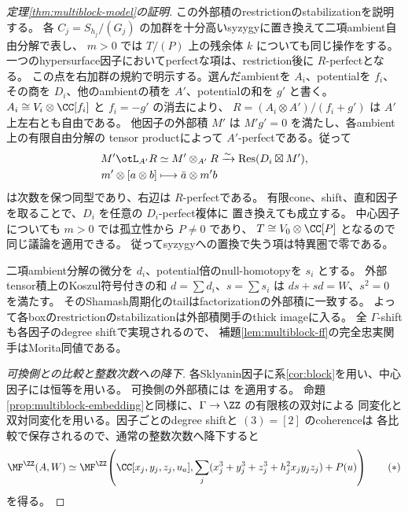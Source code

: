 \begin{proof}[定理\ref{thm:multiblock-model}の証明]
 この外部積のrestrictionのstabilizationを説明する。
 各 \(C_j=S_{h_j}/(G_j)\) の加群を十分高いsyzygyに置き換えて二項ambient自由分解で表し、
 \(m>0\) では \(T/(P)\) 上の残余体 \(k\) についても同じ操作をする。
 一つのhypersurface因子においてperfectな項は、restriction後に \(R\)-perfectとなる。
 この点を右加群の規約で明示する。選んだambientを \(A_i\)、potentialを \(f_i\)、
 その商を \(D_i\)、他のambientの積を \(A'\)、potentialの和を \(g'\) と書く。
 \(A_i\cong V_i\otimes\CC[f_i]\) と \(f_i=-g'\) の消去により、
 \(R=(A_i\otimes A')/(f_i+g')\) は \(A'\) 上左右とも自由である。
 他因子の外部積 \(M'\) は \(M'g'=0\) を満たし、各ambient上の有限自由分解の
 tensor productによって \(A'\)-perfectである。従って
 \[
 \begin{aligned}
 M'\otL_{A'}R&\simeq M'\otimes_{A'}R
       \xrightarrow{\sim}\operatorname{Res}(D_i\boxtimes M'),\\
 m'\otimes[a\otimes b]&\longmapsto\bar a\otimes m'b
 \end{aligned}
 \]
 は次数を保つ同型であり、右辺は \(R\)-perfectである。
 有限cone、shift、直和因子を取ることで、\(D_i\) を任意の \(D_i\)-perfect複体に
 置き換えても成立する。
 中心因子についても \(m>0\) では孤立性から \(P\ne0\) であり、
 \(T\cong V_0\otimes\CC[P]\) となるので同じ議論を適用できる。
 従ってsyzygyへの置換で失う項は特異圏で零である。

 二項ambient分解の微分を \(d_i\)、potential倍のnull-homotopyを \(s_i\) とする。
 外部tensor積上のKoszul符号付きの和 \(d=\sum d_i\)、\(s=\sum s_i\) は
 \(ds+sd=W\)、\(s^2=0\) を満たす。
 そのShamash周期化のtailはfactorizationの外部積に一致する。
 よって各boxのrestrictionのstabilizationは外部積関手のthick imageに入る。
 全 \(\Gamma\)-shiftも各因子のdegree shiftで実現されるので、
 補題\ref{lem:multiblock-ff}の完全忠実関手はMorita同値である。

 \emph{可換側との比較と整数次数への降下.}
 各Sklyanin因子に系\ref{cor:block}を用い、中心因子には恒等を用いる。
 可換側の外部積には \cite[Theorem 5.15, Corollary 5.18]{BFK} を適用する。
 命題\ref{prop:multiblock-embedding}と同様に、\(\Gamma\to\ZZ\) の有限核の双対による
 同変化と双対同変化を用いる。因子ごとのdegree shiftと \((3)=[2]\) のcoherenceは
 各比較で保存されるので、通常の整数次数へ降下すると
 \[
 \MF^{\ZZ}(A,W)\simeq
 \MF^{\ZZ}\!\left(\CC[x_j,y_j,z_j,u_a],
 \sum_j(x_j^3+y_j^3+z_j^3+h_j^2x_jy_jz_j)+P(u)\right)
 \tag{\(*\)}\label{eq:PI-model}
 \]
 を得る。


\end{proof}
